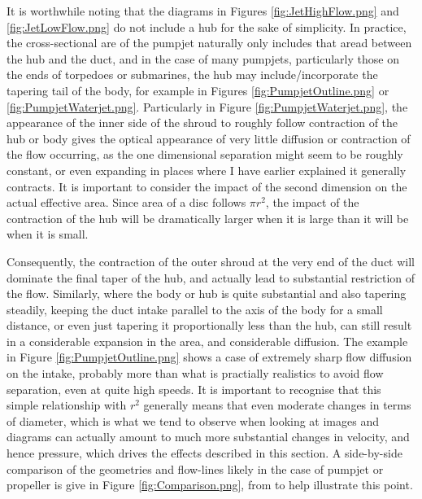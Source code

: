 \documentclass{article}\usepackage[]{graphicx}\usepackage[]{color}
\begin{document}
It is worthwhile noting that the diagrams in Figures \ref{fig:JetHighFlow.png} and \ref{fig:JetLowFlow.png} do not include a hub for the sake of simplicity.  In practice, the cross-sectional are of the pumpjet naturally only includes that aread between the hub and the duct, and in the case of many pumpjets, particularly those on the ends of torpedoes or submarines, the hub may include/incorporate the tapering tail of the body, for example in Figures \ref{fig:PumpjetOutline.png} or \ref{fig:PumpjetWaterjet.png}.  Particularly in Figure \ref{fig:PumpjetWaterjet.png}, the appearance of the inner side of the shroud to roughly follow contraction of the hub or body gives the optical appearance of very little diffusion or contraction of the flow occurring, as the one dimensional separation might seem to be roughly constant, or even expanding in places where I have earlier explained it generally contracts.  It is important to consider the impact of the second dimension on the actual effective area. Since area of a disc follows $\pi r^2$, the impact of the contraction of the hub will be dramatically larger when it is large than it will be when it is small.

Consequently, the contraction of the outer shroud at the very end of the duct will dominate the final taper of the hub, and actually lead to substantial restriction of the flow.  Similarly, where the body or hub is quite substantial and also tapering steadily, keeping the duct intake parallel to the axis of the body for a small distance, or even just tapering it proportionally less than the hub, can still result in a considerable expansion in the area, and considerable diffusion.  The example in Figure \ref{fig:PumpjetOutline.png} shows a case of extremely sharp flow diffusion on the intake, probably more than what is practially realistics to avoid flow separation, even at quite high speeds. It is important to recognise that this simple relationship with $r^2$ generally means that even moderate changes in terms of diameter, which is what we tend to observe when looking at images and diagrams can actually amount to much more substantial changes in velocity, and hence pressure, which drives the effects described in this section.  A side-by-side comparison of the geometries and flow-lines likely in the case of pumpjet or propeller is give in Figure \ref{fig:Comparison.png}, from  to help illustrate this point.
\end{document}
